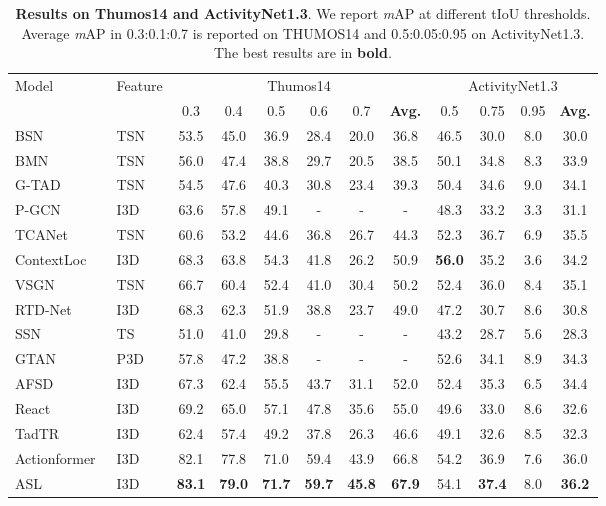 \documentclass[10pt,twocolumn,letterpaper]{article}
\begin{document}
\begin{table*}[t]
 \centering 
 \caption{\label{tab:result_thumosandanet} \textbf{Results on Thumos14 and ActivityNet1.3}. We report \textit{m}AP at different tIoU thresholds. Average \textit{m}AP in 0.3:0.1:0.7 is reported on THUMOS14 and 0.5:0.05:0.95 on ActivityNet1.3. The best results are in \textbf{bold}. }
 \vspace{0.5em}
 \small
 {
  \begin{tabular}{l|l|cccccc|cccc} 
  \toprule
  \multirow{2}{*}{Model} & \multirow{2}{*}{Feature} & \multicolumn{6}{c}{Thumos14} & \multicolumn{4}{c}{ActivityNet1.3}\tabularnewline
 & & 0.3  & 0.4 & 0.5 & 0.6& 0.7 & \textbf{Avg.} & 0.5 & 0.75 & 0.95 & \textbf{Avg.} \\

    \hline
     BSN~\cite{BSN2018arXiv} & TSN~\cite{tsn} & 53.5 & 45.0 & 36.9 & 28.4 & 20.0 & 36.8 & 46.5 & 30.0 & 8.0 & 30.0 \tabularnewline 
    BMN~\cite{lin2019bmn} & TSN~\cite{tsn}& 56.0 & 47.4 & 38.8 & 29.7 & 20.5 & 38.5 & 50.1 & 34.8 & 8.3 & 33.9  \tabularnewline 
    G-TAD~\cite{xu2020gtad} & TSN~\cite{tsn} & 54.5 & 47.6 & 40.3 & 30.8 & 23.4 & 39.3 & 50.4 & 34.6 & 9.0 & 34.1\tabularnewline 
    P-GCN~\cite{PGCN2019ICCV} & I3D~\cite{i3d} & 63.6 &57.8 &49.1 & - & - & - & 48.3 & 33.2 & 3.3 & 31.1 \tabularnewline 
    TCANet~\cite{tcanet} & TSN~\cite{tsn} & 60.6 & 53.2 & 44.6 & 36.8 & 26.7 & 44.3 & 52.3 & 36.7 & 6.9 & 35.5 \tabularnewline 
    ContextLoc~\cite{contextloc} & I3D~\cite{i3d} & 68.3 & 63.8 & 54.3 & 41.8 & 26.2 & 50.9 & \textbf{56.0} & 35.2 & 3.6 & 34.2
   \tabularnewline 
    VSGN~\cite{vsgn} & TSN~\cite{tsn} & 66.7 & 60.4 & 52.4 & 41.0 & 30.4 & 50.2 & 52.4 & 36.0 & 8.4 & 35.1
     \tabularnewline 
     RTD-Net~\cite{rtdnet} & I3D~\cite{i3d} & 68.3 & 62.3 & 51.9 & 38.8 & 23.7 & 49.0 & 47.2  & 30.7 & 8.6 & 30.8
    \tabularnewline 
      SSN~\cite{SSN2017ICCV} & TS~\cite{ts} & 51.0 & 41.0 & 29.8 & - & - & - & 43.2 & 28.7 & 5.6 & 28.3 \tabularnewline 
      GTAN~\cite{gtan} & P3D~\cite{p3d} & 57.8 & 47.2 & 38.8 & - & - & -  & {52.6} & 34.1 & 8.9 & 34.3 \tabularnewline 
     AFSD~\cite{afsd} & I3D~\cite{i3d} & 67.3 & 62.4 & 55.5 & 43.7 & 31.1 & 52.0 & 52.4 & 35.3 & 6.5 & 34.4 \tabularnewline 
     React~\cite{shi2022react} & I3D~\cite{i3d} & 69.2 & 65.0 & 57.1 & 47.8 & 35.6 & 55.0 &49.6 & 33.0 & 8.6 & 32.6 \tabularnewline
     TadTR~\cite{tadtr} & I3D~\cite{i3d} & 62.4 & 57.4 & 49.2 & 37.8 & 26.3 & 46.6 & 49.1 & 32.6 & 8.5 & 32.3 \tabularnewline 
   Actionformer~\cite{zhang2022actionformer} & I3D~\cite{i3d} & 82.1 & 77.8 & 71.0 & 59.4 & 43.9 & 66.8 & 54.2 & 36.9 & 7.6 & 36.0 \tabularnewline
   \hline
    ASL & I3D~\cite{i3d} & \textbf{83.1} & \textbf{79.0} & \textbf{71.7} & \textbf{59.7} & \textbf{45.8} & \textbf{67.9} & 54.1 & \textbf{37.4} & 8.0 & \textbf{36.2} \tabularnewline
\bottomrule
\end{tabular}
 }
\end{table*}
\end{document}
